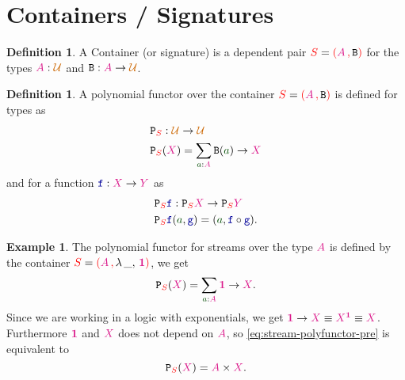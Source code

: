 \documentclass[twoside,11pt,openright]{report}
\theoremstyle{plain} %
\theoremstyle{definition}
\newtheorem{defn}[thm]{Definition}%
\newtheorem{exmp}{Example} %
\theoremstyle{remark}
\newcommand*{\term}[1]{\textcolor{green!30!black}{#1}} %
\newcommand*{\type}[1]{\textcolor{magenta!90!black}{#1}}
\newcommand*{\container}[1]{\textcolor{red}{#1}}
\newcommand*{\containerpair}[2]{\ensuremath{\colorlet{savedleftcolor}{.}\color{red}\left(\color{savedleftcolor}#1\,\textcolor{red}{\mathbf{,}}\,#2\color{red}\right)\color{savedleftcolor}}}
\newcommand*{\containerpairsimple}[2]{\containerpair{#1}{\lambda\,\_,\,#2}}
\newcommand*{\universe}[1]{\textcolor{orange!80!black}{#1}}
\newcommand*{\unit}{\type{\textbf{1}}}
\newcommand*{\function}[1]{\textcolor{blue!60!black}{\ensuremath{\mathtt{#1}}}}
\newcommand*{\typeformer}[1]{\ensuremath{\mathtt{#1}}}
\newcommand*{\functor}[1]{\ensuremath{\mathbf{\mathtt{#1}}}}
\begin{document}
\section{Containers / Signatures}
\begin{defn}
  A Container (or signature) is a dependent pair \(\container{S} = \containerpair{\type{A}}{\typeformer{B}}\) for the types \(\type{A} : \universe{\mathcal{U}}\) and \(\typeformer{B} : \type{A} \rightarrow \universe{\mathcal{U}}\).
\end{defn}
\begin{defn}
  A polynomial functor over the container \(\container{S} = \containerpair{\type{A}}{\typeformer{B}}\) is defined for types as
  \begin{equation}
    \begin{aligned}
      &\functor{P}_{\container{S}} : \universe{\mathcal{U}} \rightarrow \universe{\mathcal{U}} \\
      &\functor{P}_{\container{S}}(\type{X}) = \sum_{\term{a} : \type{A}} \typeformer{B}(\term{a}) \rightarrow \type{X}
    \end{aligned}
  \end{equation}
  and for a function \(\function{f} : \type{X} \rightarrow \type{Y}\) as
  \begin{equation}
    \begin{aligned}
      &\functor{P}_{\container{S}}\function{f} : \functor{P}_{\container{S}}\type{X} \rightarrow \functor{P}_{\container{S}}\type{Y} \\
      &\functor{P}_{\container{S}}\function{f}(\term{a},\function{g}) = (\term{a}, \function{f} \circ \function{g}).
    \end{aligned}
  \end{equation}
\end{defn}
\begin{exmp}
  The polynomial functor for streams over the type \(\type{A}\) is defined by the container \(\container{S} = \containerpairsimple{\type{A}}{\unit}\), we get
  \begin{equation}
    \label{eq:stream-polyfunctor-pre}
    \functor{P}_{\container{S}}(\type{X}) = \sum_{\term{a} : \type{A}} \unit \rightarrow \type{X}.
  \end{equation}
  Since we are working in a logic with exponentials, we get \(\unit \rightarrow \type{X} \equiv \type{X}^{\unit} \equiv \type{X}\). Furthermore \(\unit\) and \(\type{X}\) does not depend on \(\type{A}\), so \eqref{eq:stream-polyfunctor-pre} is equivalent to
  \begin{equation}
    \functor{P}_{\container{S}}(\type{X}) = \type{A} \times \type{X}.
  \end{equation}
\end{exmp}
\end{document}
